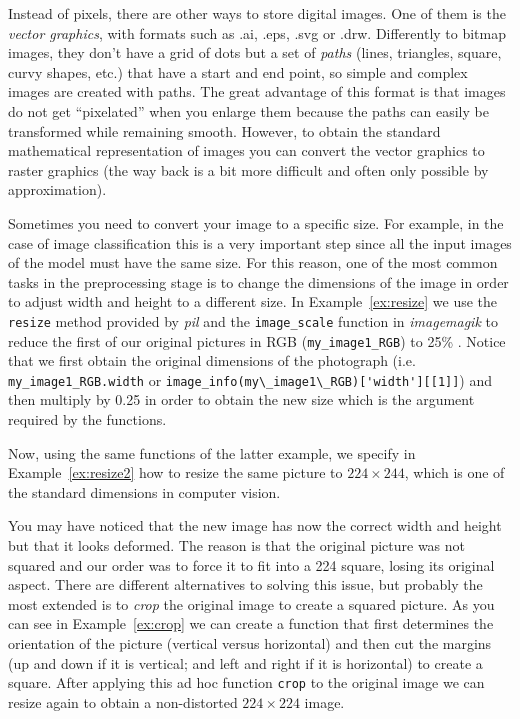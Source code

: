 
Instead of pixels, there are other ways to store digital images. One of them is the \textit{vector graphics}, with formats such as .ai, .eps, .svg or .drw. Differently to bitmap images, they don't have a grid of dots but a set of \textit{paths} (lines, triangles, square, curvy shapes, etc.) that have a start and end point, so  simple and complex images are created with paths. The great advantage of this format is that images do not get  ``pixelated'' when you enlarge them because the paths can easily be transformed 	while remaining smooth. However, to obtain the standard mathematical representation of images you can convert the vector graphics to raster graphics (the way back is a bit more difficult and often only possible by approximation).

Sometimes you need to convert your image to a specific size. For example, in the case of image classification this is a very important step since all the input images of the model must have the same size. For this reason, one of the most common tasks in the preprocessing stage is to change the dimensions of the image in order to adjust width and height to a different size. In Example~\ref{ex:resize} we use the \texttt{resize} method provided by \emph{pil} and the \texttt{image\_scale} function in \emph{imagemagik} to reduce the first of our original pictures in RGB (\texttt{my\_image1\_RGB}) to 25\% . Notice that we first obtain the original dimensions of the photograph (i.e. \texttt{my\_image1\_RGB.width} or \verb|image_info(my\_image1\_RGB)['width'][[1]]|) and then multiply by 0.25 in order to obtain the new size which is the argument required by the functions.


Now, using the same functions of the latter example, we specify in Example~\ref{ex:resize2} how to resize the same picture to $224 \times 244$, which is one of the standard dimensions in computer vision.


You may have noticed that the new image has now the correct width and height but that it looks deformed. The reason is that the original picture was not squared and our order was to force it to fit  into a 224  square, losing its original aspect. There are different alternatives to solving this issue, but probably the most extended is to \textit{crop} the original image to create a squared picture. As you can see in Example~\ref{ex:crop} we can create a function that first determines the orientation of the picture (vertical versus horizontal) and then cut the margins  (up and down if it is vertical; and left and right if it is horizontal) to create a square. After applying this ad hoc function \texttt{crop} to the original image we can resize again to obtain a non-distorted $224 \times 224$ image.

